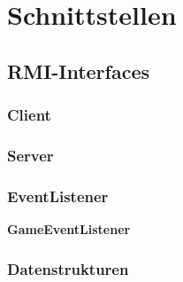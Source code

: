 \section{Schnittstellen} 

\subsection{RMI-Interfaces}

\subsubsection{Client}





\subsubsection{Server}



\subsubsection{EventListener}



\textbf{GameEventListener}



\subsubsection{Datenstrukturen}








